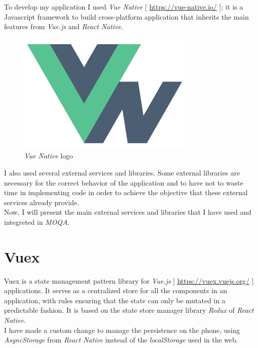 To develop my application I used \textit{Vue Native} [ \url{https://vue-native.io/} ]; it is a Javascript framework to build cross-platform application that inherits the main features from \textit{Vue.js} and \textit{React Native}.\\ 

\begin{figure}[h]
\begin{center}
  \includegraphics[width=.5\textwidth]{img/logos/logo_vuenative.png}
  \hspace{0.05\linewidth}
  \centering
  \caption{\textit{Vue Native} logo}
  \label{img:logo_vuenative}
\end{center}
\end{figure}

I also used several external services and libraries.
Some external libraries are necessary for the correct behavior of the application and to have not to waste time in implementing code in order to achieve the objective that these external services already provide.\\

Now, I will present the main external services and libraries that I have used and integreted in \textit{MOQA}.

\section{Vuex}
Vuex is a state management pattern library for \textit{Vue.js} [ \url{https://vuex.vuejs.org/} ] applications. It serves as a centralized store for all the components in an application, with rules ensuring that the state can only be mutated in a predictable fashion. It is based on the state store manager library \textit{Redux} of \textit{React Native}.\\

I have made a custom change to manage the persistence on the phone, using \textit{AsyncStorage} from \textit{React Native} instead of the \textit{localStorage} used in the web.



